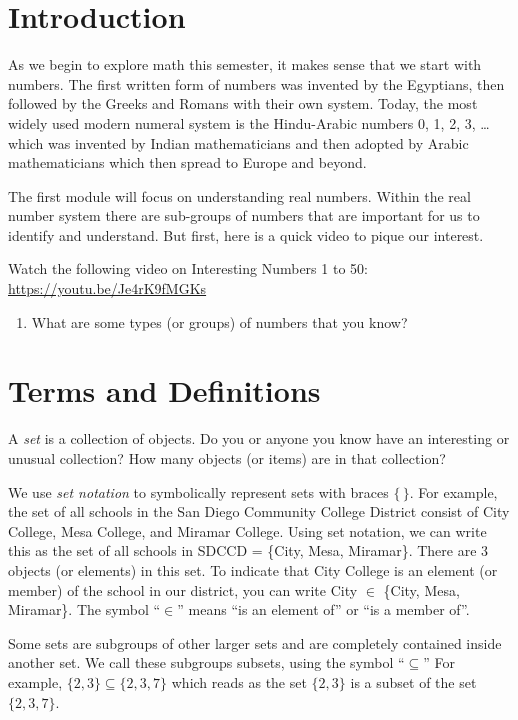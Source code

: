 \documentclass{article}
\begin{document}
\section*{Introduction}
As we begin to explore math this semester, it makes sense that we start with numbers.  The first written form of numbers was invented by the Egyptians, then followed by the Greeks and Romans with their own system.  Today, the most widely used modern numeral system is the Hindu-Arabic numbers 0, 1, 2, 3, … which was invented by Indian mathematicians and then adopted by Arabic mathematicians which then spread to Europe and beyond.

The first module will focus on understanding real numbers.  Within the real number system there are sub-groups of numbers that are important for us to identify and understand.  But first, here is a quick video to pique our interest.

Watch the following video on Interesting Numbers 1 to 50:  \url{https://youtu.be/Je4rK9fMGKs}

\begin{enumerate}
\item What are some types (or groups) of numbers that you know?
\end{enumerate}

\section*{Terms and Definitions}

A \emph{set} is a collection of objects.  Do you or anyone you know have an interesting or unusual collection?  How many objects (or items) are in that collection?

We use \emph{set notation} to symbolically represent sets with braces \(\{\, \}\).  For example, the set of all schools in the San Diego Community College District consist of City College, Mesa College, and Miramar College.  Using set notation, we can write this as the set of all schools in SDCCD = \{City, Mesa, Miramar\}.  There are 3 objects (or elements) in this set.  To indicate that City College is an element (or member) of the school in our district, you can write City \(\in\) \{City, Mesa, Miramar\}.  The symbol ``\(\in\)''  means ``is an element of'' or ``is a member of''.

Some sets are subgroups of other larger sets and are completely contained inside another set.  We call these subgroups subsets, using the symbol ``\(\subseteq\)''  For example, \(\{2, 3\}\subseteq  \{2, 3, 7\}\) which reads as the set \(\{2, 3\}\) is a subset of the set \(\{2, 3, 7\}\).
\end{document}
